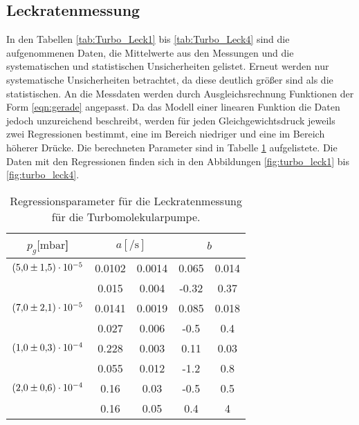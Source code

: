 \subsection{Leckratenmessung}
In den Tabellen \ref{tab:Turbo_Leck1} bis \ref{tab:Turbo_Leck4} sind die aufgenommenen Daten, die 
Mittelwerte aus den Messungen und die systematischen und statistischen Unsicherheiten gelistet.
Erneut werden nur systematische Unsicherheiten betrachtet, da diese deutlich größer sind als die 
statistischen. 
An die Messdaten werden durch Ausgleichsrechnung Funktionen der Form \ref{eqn:gerade} angepasst.
Da das Modell einer linearen Funktion die Daten jedoch unzureichend beschreibt, werden 
für jeden Gleichgewichtsdruck jeweils zwei Regressionen bestimmt, eine im Bereich niedriger 
und eine im Bereich höherer Drücke. Die berechneten Parameter sind in Tabelle \ref{tab:Turbo_Leck_para}
aufgelistete. Die Daten mit den Regressionen finden sich in den Abbildungen \ref{fig:turbo_leck1} 
bis \ref{fig:turbo_leck4}.
\begin{table}[H]
    \centering
      \caption{Regressionsparameter für die Leckratenmessung für die Turbomolekularpumpe.}
      \label{tab:Turbo_Leck_para}
      \begin{tabular}{c c @{${}\pm{}$} c c @{${}\pm{}$} c}
        \toprule
        {$p_g [\si{\milli\bar}$]} & \multicolumn{2}{c}{$a [\si{\per\second}]$} & \multicolumn{2}{c}{$b$} \\
        \midrule
        $\num{5.0 \pm 1.5 e-5}$  & 0.0102 & 0.0014 & 0.065 & 0.014\\
                      & 0.015  & 0.004  & -0.32 & 0.37 \\
        \midrule
        $\num{7.0 \pm 2.1 e-5}$  & 0.0141 & 0.0019 & 0.085 & 0.018\\
                      & 0.027  & 0.006  & -0.5  & 0.4  \\
        \midrule
        $\num{1.0 \pm 0.3 e-4}$  & 0.228  & 0.003  & 0.11  & 0.03 \\
                      & 0.055  & 0.012  & -1.2  & 0.8  \\
        \midrule
        $\num{2.0 \pm 0.6 e-4}$  & 0.16   & 0.03   & -0.5  & 0.5  \\
                      & 0.16   & 0.05   & 0.4   & 4    \\
        \bottomrule
      \end{tabular}
\end{table}
